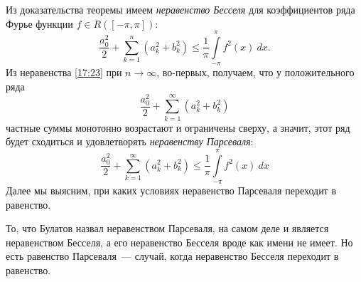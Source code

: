 \documentclass[../../main.tex]{subfiles}
\begin{document}
	Из доказательства теоремы имеем \emph{неравенство Бесселя} для коэффициентов 
	ряда Фурье функции $f \in R\left( [-\pi,\pi]\right) $:
	\begin{equation}
	\label{17:23}
	\frac{a_0^2}{2} + \sum_{k=1}^{n} \left( a_k^2 + b_k^2\right) \le 
	\frac{1}{\pi}  \int\limits_{-\pi}^{\pi} f^2(x) \ dx.
	\end{equation}
	Из неравенства \eqref{17:23} при $n \to \infty$, во-первых, получаем, что у 
	положительного ряда
	\[  \frac{a_0^2}{2} + \sum_{k=1}^{\infty} \left( a_k^2 + b_k^2  \right)     \]
	частные суммы монотонно возрастают и ограничены сверху, а значит, этот ряд 
	будет сходиться и удовлетворять \emph{неравенству Парсеваля}: 
	\begin{equation}
	\label{17:24}
	\frac{a_0^2}{2} + \sum_{k=1}^{\infty} \left( a_k^2 + b_k^2\right) \le 
	\frac{1}{\pi}  \int\limits_{-\pi}^{\pi} f^2(x) \ dx
	\end{equation}
	Далее мы выясним, при каких условиях неравенство Парсеваля переходит в 
	равенство.
	
	\begin{erem}
	То, что Булатов назвал неравенством Парсеваля, на самом деле и является 
	неравенством Бесселя, а его неравенство Бесселя вроде как имени не имеет. Но 
	есть равенство Парсеваля~--- случай, когда неравенство Бесселя переходит в 
	равенство.
	\end{erem}
	
\end{document}
